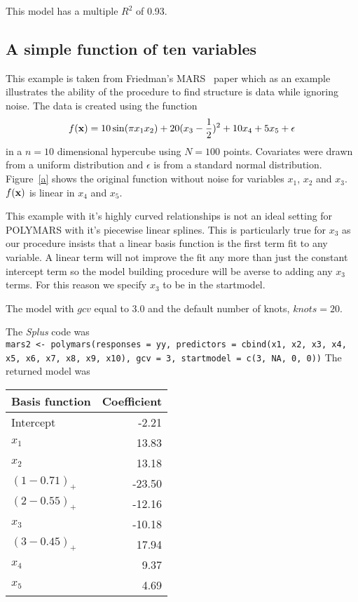 \noindent
This model has a multiple $R^2$ of 0.93.


\subsection{A simple function of ten variables}
This example is taken from Friedman's MARS~\cite{A} paper which as an example illustrates the ability of
the procedure to find structure is data while ignoring noise. The data
is created using the function 
$$ f({\bf x}) = 10\sin(\pi x_1x_2)+20(x_3-\frac{1}{2})^2+10x_4+5x_5+ \epsilon$$
in a $n = 10$ dimensional hypercube using $N = 100$ points. Covariates
were drawn from a uniform distribution and $\epsilon$ is from a
standard normal distribution. Figure~\ref{a} shows the original
function without noise for variables $x_1$, $x_2$ and $x_3$. $f({\bf
x})$ is linear in $x_4$ and $x_5$.  

This example with it's highly curved
relationships is not an ideal setting for POLYMARS with it's piecewise
linear splines. This is particularly true for $x_3$ as our procedure
insists that a linear basis function is the first term fit to any
variable. A linear term will not improve the fit any more than just
the constant intercept term so the model building procedure will be
averse to adding any $x_3$ terms. For this reason we specify $x_3$ to be in the startmodel.


The model with $gcv$ equal
to 3.0 and the default number of knots, $knots = 20$.

\noindent
The {\it Splus} code was\\
{\tt mars2 <- polymars(responses = yy, predictors = cbind(x1, x2, x3,
x4, x5, x6, x7, x8, x9, x10), gcv = 3, startmodel = c(3, NA, 0, 0))}
\newpage
\noindent
The returned model was

\begin{tabular}{lr}\hline
Basis function           & Coefficient \\\hline
Intercept                & -2.21\\
$x_1$                        & 13.83\\
$x_2$                        & 13.18\\
$(1 - 0.71)_+$           &  -23.50\\
$(2 - 0.55)_+$           & -12.16\\
$x_3$                        & -10.18\\
$(3 - 0.45)_+$           & 17.94\\
$x_4$                        & 9.37\\
$x_5$                        & 4.69\\
\hline
\end{tabular}

